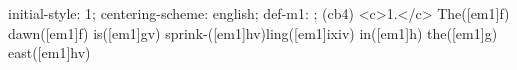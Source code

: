 initial-style: 1;
centering-scheme: english;
def-m1: \grealign;
(cb4) <c>1.</c> The([em1]f) dawn([em1]f) is([em1]gv) sprink-([em1]hv)ling([em1]ixiv) in([em1]h) the([em1]g) east([em1]hv)